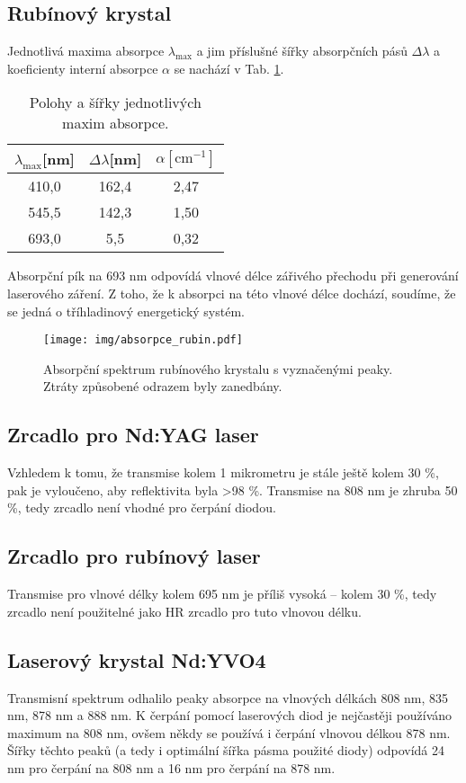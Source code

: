 	\subsection{Rubínový krystal}
	Jednotlivá maxima absorpce $\lambda_{\mathrm{max}}$ a jim příslušné šířky absorpčních pásů $\Delta\lambda$ a koeficienty interní absorpce $\alpha$ se nachází v Tab. \ref{tab:absorpce}.
\begin{table}[!hbt]
\centering
	\begin{tabular}{|c|c|c|}
		\hline
		$\lambda_{\mathrm{max}}$[nm] & $\Delta\lambda$[nm] & $\alpha[\mathrm{cm^{-1}}]$ \\ \hline\hline
		410,0 & 162,4 & 2,47\\ \hline
		545,5 & 142,3 &1,50\\ \hline
		693,0 & 5,5 & 0,32\\ \hline
	\end{tabular}
	\caption{Polohy a šířky jednotlivých maxim absorpce.}
	\label{tab:absorpce}
\end{table}
Absorpční pík na 693 nm odpovídá vlnové délce zářivého přechodu při generování laserového záření. Z toho, že k absorpci na této vlnové délce dochází, soudíme, že se jedná o tříhladinový energetický systém.
\begin{figure}[!hbt]
  \centering
    \texttt{[image: img/absorpce\_rubin.pdf]} 
    \caption{Absorpční spektrum rubínového krystalu s vyznačenými peaky. Ztráty způsobené odrazem byly zanedbány.}
    \label{fig:absorpce_rubin} %
\end{figure} 
	

	
	\subsection{Zrcadlo pro Nd:YAG laser}	
	Vzhledem k tomu, že transmise kolem 1 mikrometru je stále ještě kolem 30 \%, pak je vyloučeno, aby reflektivita byla >98 \%. Transmise na 808 nm je zhruba 50 \%, tedy zrcadlo není vhodné pro čerpání diodou.
	
	\subsection{Zrcadlo pro rubínový laser}
	Transmise pro vlnové délky kolem 695 nm je příliš vysoká -- kolem 30 \%, tedy zrcadlo není použitelné jako HR zrcadlo pro tuto vlnovou délku.
	
	\subsection{Laserový krystal Nd:YVO4}
	Transmisní spektrum odhalilo peaky absorpce na vlnových délkách 808 nm, 835 nm, 878 nm a 888 nm. K čerpání pomocí laserových diod je nejčastěji používáno maximum na 808 nm, ovšem někdy se používá i čerpání vlnovou délkou 878 nm. Šířky těchto peaků (a tedy i optimální šířka pásma použité diody) odpovídá 24 nm pro čerpání na 808 nm a 16 nm pro čerpání na 878 nm.\\
	
